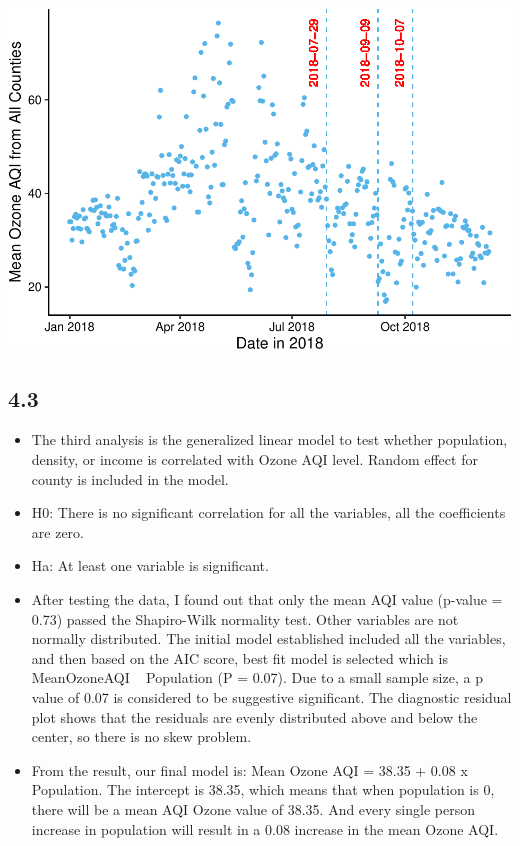 \documentclass[12pt,]{article}
\begin{document}
\includegraphics{Xia_ENV_872_Project_files/figure-latex/Final visualization 3-1.pdf}
\pagebreak

\subsection{4.3}\label{section-2}

\begin{itemize}
\item[]The third analysis is the generalized linear model to test whether population, density, or income is correlated with Ozone AQI level. Random effect for county is included in the model.
\item[]H0: There is no significant correlation for all the variables, all the coefficients are zero. 
\item[]Ha: At least one variable is significant.
\item[]After testing the data, I found out that only the mean AQI value (p-value = 0.73) passed the Shapiro-Wilk normality test. Other variables are not normally distributed. The initial model established included all the variables, and then based on the AIC score, best fit model is selected which is MeanOzoneAQI  ~ Population (P = 0.07). Due to a small sample size, a p value of 0.07 is considered to be suggestive significant. The diagnostic residual plot shows that the residuals are evenly distributed above and below the center, so there is no skew problem.
\item[]From the result, our final model is: Mean Ozone AQI = 38.35 + 0.08 x Population. The intercept is 38.35, which means that when population is 0, there will be a mean AQI Ozone value of 38.35. And every single person increase in population will result in a 0.08 increase in the mean Ozone AQI.
\end{itemize}
\end{document}
